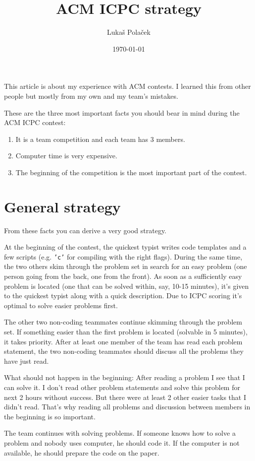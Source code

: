 \documentclass{article}
\author{Lukaš Polaček}
\title{ACM ICPC strategy}
\date{\today}
\begin{document}
\maketitle
This article is about my experience with ACM contests. I learned this from other
people but mostly from my own and my team's mistakes.

These are the three most important facts you should bear in mind during the ACM ICPC
contest:
\begin{enumerate}
\item It is a team competition and each team has 3 members.
\item Computer time is very expensive.
\item The beginning of the competition is the most important part of the contest.
\end{enumerate}

\section{General strategy}
From these facts you can derive a very good strategy.

At the beginning of the contest, the quickest typist writes code templates and a
few scripts (e.g. {\tt 'c'} for compiling with the right flags). During the same
time, the two others skim through the problem set in search for an easy problem
(one person going from the back, one from the front). As soon as a sufficiently
easy problem is located (one that can be solved within, say, 10-15 minutes),
it's given to the quickest typist along with a quick description. Due to ICPC
scoring it's optimal to solve easier problems first.

The other two non-coding teammates continue skimming through the problem set.
If something easier than the first problem is located (solvable in 5 minutes),
it takes priority. After at least one member of the team has read each problem
statement, the two non-coding teammates should discuss all the problems they
have just read.

What should not happen in the beginning: After reading a problem I see that I
can solve it. I don't read other problem statements and solve this problem for
next 2 hours without success. But there were at least 2 other easier tasks that
I didn't read. That's why reading all problems and discussion between members in
the beginning is so important.

The team continues with solving problems. If someone knows how to solve a
problem and nobody uses computer, he should code it. If the computer is not
available, he should prepare the code on the paper.
\end{document}
